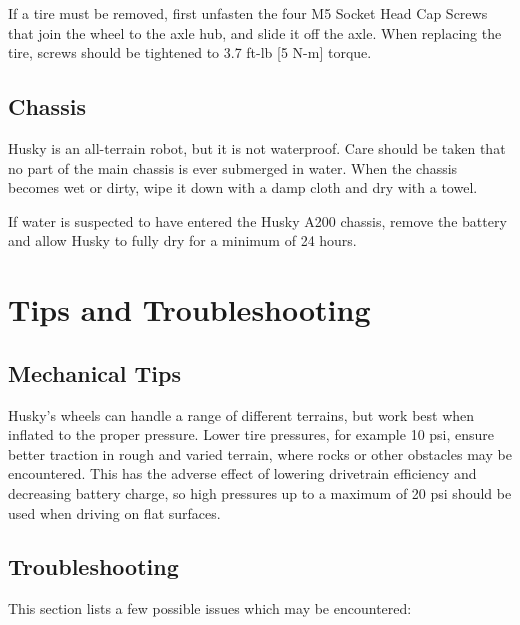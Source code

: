 \documentclass[]{clearpath-latex/clearpath-manual}
\begin{document}
If a tire must be removed, first unfasten the four M5 Socket Head Cap Screws that join the wheel to the axle hub,
and slide it off the axle. When replacing the tire, screws should be tightened to 3.7 ft-lb [5 N-m] torque.

\subsection{Chassis}
Husky is an all-terrain robot, but it is not waterproof. Care should be taken that no part of the main
chassis is ever submerged in water. When the chassis becomes wet or dirty, wipe it down with a damp cloth
and dry with a towel.

If water is suspected to have entered the Husky A200 chassis, remove the battery and allow Husky to fully dry for a minimum of 24 hours.

\section{Tips and Troubleshooting}

\subsection{Mechanical Tips}
Husky’s wheels can handle a range of different terrains, but work best when inflated to the proper pressure.
Lower tire pressures, for example 10 psi, ensure better traction in rough and varied terrain, where rocks or
other obstacles may be encountered. This has the adverse effect of lowering drivetrain efficiency and decreasing
battery charge, so high pressures up to a maximum of 20 psi should be used when driving on flat surfaces.

\subsection{Troubleshooting}

This section lists a few possible issues which may be encountered:
\end{document}
